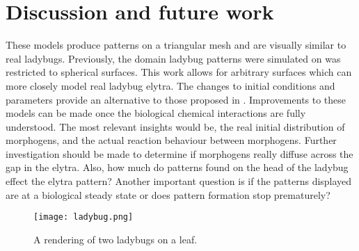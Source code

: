 \section{Discussion and future work}
These models produce patterns on a triangular mesh and are visually similar to real ladybugs. Previously, the domain ladybug patterns were simulated on was restricted to spherical surfaces. This work allows for arbitrary surfaces which can more closely model real ladybug elytra. The changes to initial conditions and parameters provide an alternative to those proposed in \citep{Liaw2001}. Improvements to these models can be made once the biological chemical interactions are fully understood. The most relevant insights would be, the real initial distribution of morphogens, and the actual reaction behaviour between morphogens. Further investigation should be made to determine if morphogens really diffuse across the gap in the elytra. Also, how much do patterns found on the head of the ladybug effect the elytra pattern? Another important question is if the patterns displayed are at a biological steady state or does pattern formation stop prematurely?

\begin{figure}[p]
	\centering
	\texttt{[image: ladybug.png]}
	\caption{A rendering of two ladybugs on a leaf.}
	\label{fig:ladybugRender}
\end{figure}